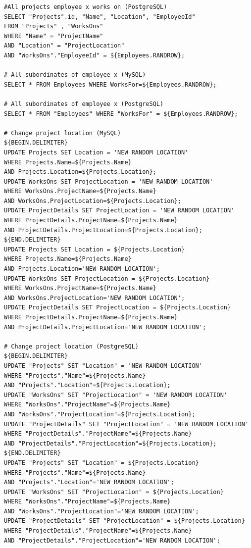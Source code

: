 \documentclass[12pt]{report}
\begin{document}
\begin{spacing}{1.9}
\begin{verbatim}
#All projects employee x works on (PostgreSQL)
SELECT "Projects".id, "Name", "Location", "EmployeeId"
FROM "Projects" , "WorksOns"
WHERE "Name" = "ProjectName"
AND "Location" = "ProjectLocation"
AND "WorksOns"."EmployeeId" = ${Employees.RANDROW};

# All subordinates of employee x (MySQL)
SELECT * FROM Employees WHERE WorksFor=${Employees.RANDROW};

# All subordinates of employee x (PostgreSQL)
SELECT * FROM "Employees" WHERE "WorksFor" = ${Employees.RANDROW};

# Change project location (MySQL)
${BEGIN.DELIMITER}
UPDATE Projects SET Location = 'NEW RANDOM LOCATION' 
WHERE Projects.Name=${Projects.Name} 
AND Projects.Location=${Projects.Location};
UPDATE WorksOns SET ProjectLocation = 'NEW RANDOM LOCATION' 
WHERE WorksOns.ProjectName=${Projects.Name} 
AND WorksOns.ProjectLocation=${Projects.Location};
UPDATE ProjectDetails SET ProjectLocation = 'NEW RANDOM LOCATION' 
WHERE ProjectDetails.ProjectName=${Projects.Name} 
AND ProjectDetails.ProjectLocation=${Projects.Location};
${END.DELIMITER}
UPDATE Projects SET Location = ${Projects.Location} 
WHERE Projects.Name=${Projects.Name} 
AND Projects.Location='NEW RANDOM LOCATION';
UPDATE WorksOns SET ProjectLocation = ${Projects.Location} 
WHERE WorksOns.ProjectName=${Projects.Name} 
AND WorksOns.ProjectLocation='NEW RANDOM LOCATION';
UPDATE ProjectDetails SET ProjectLocation = ${Projects.Location} 
WHERE ProjectDetails.ProjectName=${Projects.Name} 
AND ProjectDetails.ProjectLocation='NEW RANDOM LOCATION';

# Change project location (PostgreSQL)
${BEGIN.DELIMITER}
UPDATE "Projects" SET "Location" = 'NEW RANDOM LOCATION'
WHERE "Projects"."Name"=${Projects.Name} 
AND "Projects"."Location"=${Projects.Location};
UPDATE "WorksOns" SET "ProjectLocation" = 'NEW RANDOM LOCATION'
WHERE "WorksOns"."ProjectName"=${Projects.Name} 
AND "WorksOns"."ProjectLocation"=${Projects.Location};
UPDATE "ProjectDetails" SET "ProjectLocation" = 'NEW RANDOM LOCATION' 
WHERE "ProjectDetails"."ProjectName"=${Projects.Name}
AND "ProjectDetails"."ProjectLocation"=${Projects.Location};
${END.DELIMITER}
UPDATE "Projects" SET "Location" = ${Projects.Location}
WHERE "Projects"."Name"=${Projects.Name} 
AND "Projects"."Location"='NEW RANDOM LOCATION';
UPDATE "WorksOns" SET "ProjectLocation" = ${Projects.Location}
WHERE "WorksOns"."ProjectName"=${Projects.Name} 
AND "WorksOns"."ProjectLocation"='NEW RANDOM LOCATION';
UPDATE "ProjectDetails" SET "ProjectLocation" = ${Projects.Location}
WHERE "ProjectDetails"."ProjectName"=${Projects.Name}
AND "ProjectDetails"."ProjectLocation"='NEW RANDOM LOCATION';


\end{verbatim}
\end{spacing}
\end{document}

